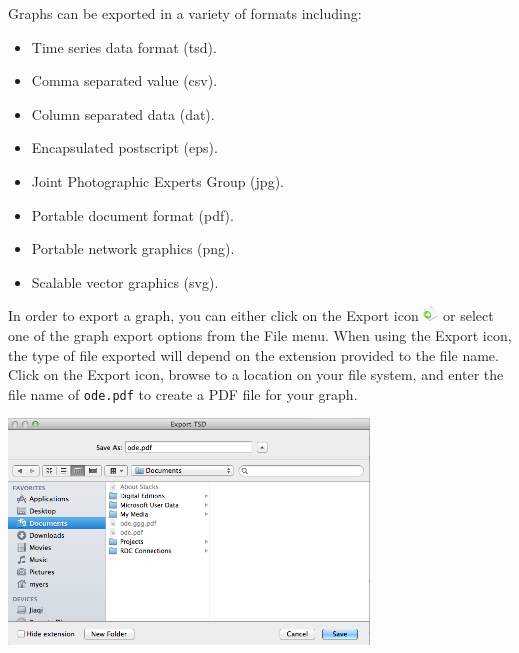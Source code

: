 \documentclass[titlepage,11pt]{article}
\begin{document}
Graphs can be exported in a variety of formats including:
\begin{itemize}
\item Time series data format (tsd).
\item Comma separated value (csv).
\item Column separated data (dat).
\item Encapsulated postscript (eps). 
\item Joint Photographic Experts Group (jpg). 
\item Portable document format (pdf).
\item Portable network graphics (png). 
\item Scalable vector graphics (svg).
\end{itemize}
In order to export a graph, you can either click on the Export icon \includegraphics{../gui/icons/export} or select one of the graph export options from the File menu.  When using the Export icon, the type of file exported will depend on the extension provided to the file name.  Click on the Export icon, browse to a location on your file system, and enter the file name of {\tt ode.pdf} to create a PDF file for your graph.

\begin{center}
\includegraphics[height=60mm]{screenshots/exportTSD}
\end{center}
\end{document}
